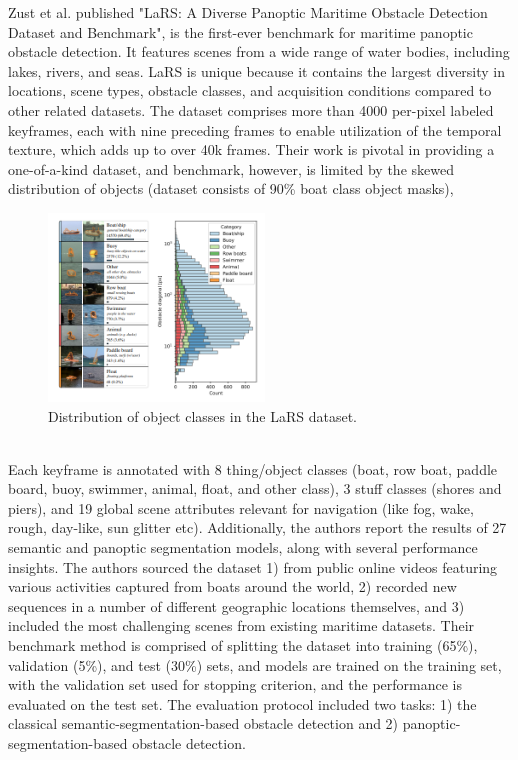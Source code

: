 Zust et al. \cite{Zust_2023_ICCV} published "LaRS: A Diverse Panoptic Maritime Obstacle Detection Dataset and Benchmark", is the first-ever benchmark for maritime panoptic obstacle detection. It features scenes from a wide range of water bodies, including lakes, rivers, and seas. LaRS is unique because it contains the largest diversity in locations, scene types, obstacle classes, and acquisition conditions compared to other related datasets. The dataset comprises more than 4000 per-pixel labeled keyframes, each with nine preceding frames to enable utilization of the temporal texture, which adds up to over 40k frames. Their work is pivotal in providing a one-of-a-kind dataset, and benchmark, however, is limited by the skewed distribution of objects (dataset consists of 90\% boat class object masks),  
\begin{figure}[H]
    \centering
    \includegraphics[width=\textwidth,height=5cm,keepaspectratio=true]{src/Images/lars_dist.PNG}
    \caption{
     Distribution of object classes in the LaRS dataset. \cite{Zust_2023_ICCV}
     }
\end{figure}
\\

Each keyframe is annotated with 8 thing/object classes (boat, row boat, paddle board, buoy, swimmer, animal, float, and other class), 3 stuff classes (shores and piers), and 19 global scene attributes relevant for navigation (like fog, wake, rough, day-like, sun glitter etc). Additionally, the authors report the results of 27 semantic and panoptic segmentation models, along with several performance insights. The authors sourced the dataset 1) from public online videos featuring various activities captured from boats around the world, 2) recorded new sequences in a number of different geographic locations themselves, and 3) included the most challenging scenes from existing maritime datasets. Their benchmark method is comprised of splitting the dataset into training (65\%), validation (5\%), and test (30\%) sets, and models are trained on the training set, with the validation set used for stopping criterion, and the performance is evaluated on the test set. The evaluation protocol included two tasks: 1) the classical semantic-segmentation-based obstacle detection and 2) panoptic-segmentation-based obstacle detection. 
\\

